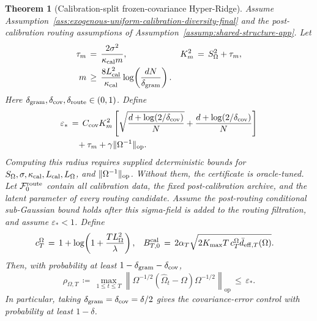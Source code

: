 \documentclass{article} %
\newtheorem{theorem}{Theorem}
\begin{document}
\begin{theorem}[Calibration-split frozen-covariance Hyper-Ridge]
Assume Assumption~\ref{ass:exogenous-uniform-calibration-diversity-final} and
the post-calibration routing assumptions of
Assumption~\ref{assump:shared-structure-app}.  Let
\begin{equation}
\begin{aligned}
\tau_m
&\,=\,
\frac{2\sigma^2}{\kappa_{\rm cal}m},
&
K_m^2
&\,=\,
S_\Omega^2+\tau_m,
\\
m
&\,\geq\,
\frac{8L_{\rm cal}^2}{\kappa_{\rm cal}}
\log\!\left(\frac{dN}{\delta_{\rm gram}}\right).
\end{aligned}
\end{equation}
Here
\(\delta_{\rm gram},\delta_{\rm cov},\delta_{\rm route}\in(0,1)\). Define
\begin{equation}
\begin{aligned}
\varepsilon_*
&\,=\,
C_{\rm cov}K_m^2\left[
\sqrt{\frac{d+\log(2/\delta_{\rm cov})}{N}}
+
\frac{d+\log(2/\delta_{\rm cov})}{N}
\right]
\\
&\quad
+
\tau_m
+
\gamma\|\Omega^{-1}\|_{\mathrm{op}}.
\end{aligned}
\end{equation}
Computing this radius requires supplied deterministic bounds for
\(S_\Omega,\sigma,\kappa_{\rm cal},L_{\rm cal},L_\Omega\), and
\(\|\Omega^{-1}\|_{\rm op}\). Without them, the certificate is oracle-tuned.
Let \(\mathcal F_0^{\rm route}\) contain all calibration data, the fixed
post-calibration archive, and the latent parameter of every routing candidate.
Assume the post-routing conditional sub-Gaussian
bound holds after this sigma-field is added to the routing filtration, and
assume \(\varepsilon_*<1\). Define
\begin{equation}
\begin{aligned}
c_T^\Omega
&\,=\,
1+\log\!\left(1+\frac{TL_\Omega^2}{\lambda}\right),
&
B_{T,0}^{\rm cal}
&\,=\,
2\alpha_T
\sqrt{
2K_{\max}T\,c_T^\Omega
\bar d_{\mathrm{eff},T}(\Omega)
}.
\end{aligned}
\end{equation}
Then, with probability at least
\(1-\delta_{\rm gram}-\delta_{\rm cov}\),
\begin{equation}
\rho_{\Omega,T}
\,\coloneqq\,
\max_{1\le t\le T}
\left\|
\Omega^{-1/2}(\widehat\Omega_t-\Omega)\Omega^{-1/2}
\right\|_{\mathrm{op}}
\,\leq\,
\varepsilon_*.
\end{equation}
In particular, taking \(\delta_{\rm gram}=\delta_{\rm cov}=\delta/2\) gives the
covariance-error control with probability at least \(1-\delta\).


\end{theorem}
\end{document}
